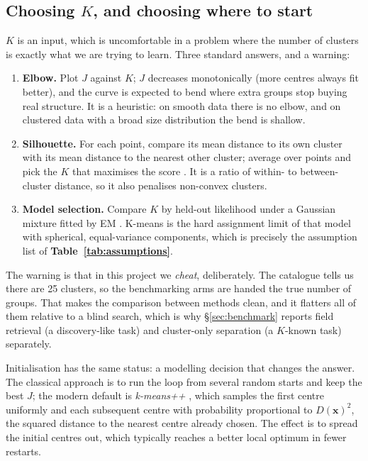 \subsection{Choosing $K$, and choosing where to start}

$K$ is an input, which is uncomfortable in a problem where the number of
clusters is exactly what we are trying to learn. Three standard answers, and a
warning:

\begin{enumerate}
\item \textbf{Elbow.} Plot $J$ against $K$; $J$ decreases monotonically
  (more centres always fit better), and the curve is expected to bend where
  extra groups stop buying real structure. It is a heuristic: on smooth data
  there is no elbow, and on clustered data with a broad size distribution the
  bend is shallow.
\item \textbf{Silhouette.} For each point, compare its mean distance to its own
  cluster with its mean distance to the nearest other cluster; average over
  points and pick the $K$ that maximises the score \citep{Rousseeuw:87}. It is
  a ratio of within- to between-cluster distance, so it also penalises
  non-convex clusters.
\item \textbf{Model selection.} Compare $K$ by held-out likelihood under a
Gaussian mixture fitted by EM \citep{Dempster:77}. K-means is the hard
assignment limit of that model with spherical, equal-variance components, which
is precisely the assumption list of \textbf{Table~\ref{tab:assumptions}}.
\end{enumerate}

The warning is that in this project we \emph{cheat}, deliberately. The
catalogue tells us there are 25 clusters, so the benchmarking arms are handed
the true number of groups. That makes the comparison between methods clean, and
it flatters all of them relative to a blind search, which is why
\S\ref{sec:benchmark} reports field retrieval (a discovery-like task) and
cluster-only separation (a $K$-known task) separately.

Initialisation has the same status: a modelling decision that changes the
answer. The classical approach is to run the loop from several random starts
and keep the best $J$; the modern default is \emph{k-means++}
\citep{Arthur:07}, which samples the first centre uniformly and each
subsequent centre with probability proportional to $D(\mathbf{x})^2$, the
squared distance to the nearest centre already chosen. The effect is to spread
the initial centres out, which typically reaches a better local optimum in
fewer restarts.

